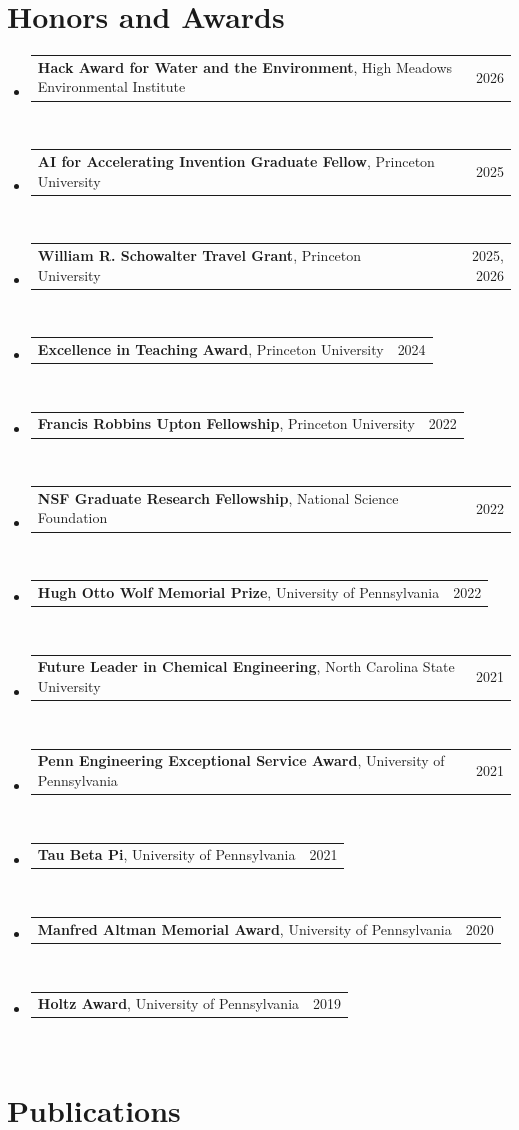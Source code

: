 \documentclass[letterpaper,11pt]{article}
\makeatletter
\newcommand{\resumeAwardItem}[3]{
  \vspace{-4pt}\item
    \begin{tabular*}{0.97\textwidth}[t]{l@{\extracolsep{\fill}}r}
      \textbf{#1}, {#2} & {#3} \\
    \end{tabular*}
}
\newcommand{\resumeSubHeadingListStart}{\begin{itemize}[leftmargin=0.15in, label={}]}
\newcommand{\resumeSubHeadingListEnd}{\end{itemize}}
\makeatother
\begin{document}
\section{Honors and Awards}
  \resumeSubHeadingListStart
    \resumeAwardItem{Hack Award for Water and the Environment}{High Meadows Environmental Institute}{2026}\\
    \resumeAwardItem{AI for Accelerating Invention Graduate Fellow}{Princeton University}{2025}\\
    \resumeAwardItem{William R. Schowalter Travel Grant}{Princeton University}{2025, 2026}\\
    \resumeAwardItem{Excellence in Teaching Award}{Princeton University}{2024}\\
    \resumeAwardItem{Francis Robbins Upton Fellowship}{Princeton University}{2022}\\
    \resumeAwardItem{NSF Graduate Research Fellowship}{National Science Foundation}{2022}\\
    \resumeAwardItem{Hugh Otto Wolf Memorial Prize}{University of Pennsylvania}{2022}\\
    \resumeAwardItem{Future Leader in Chemical Engineering}{North Carolina State University}{2021}\\
    \resumeAwardItem{Penn Engineering Exceptional Service Award}{University of Pennsylvania}{2021}\\
    \resumeAwardItem{Tau Beta Pi}{University of Pennsylvania}{2021}\\
    \resumeAwardItem{Manfred Altman Memorial Award}{University of Pennsylvania}{2020}\\
    \resumeAwardItem{Holtz Award}{University of Pennsylvania}{2019}\\
  \resumeSubHeadingListEnd


\section{Publications}
\end{document}
